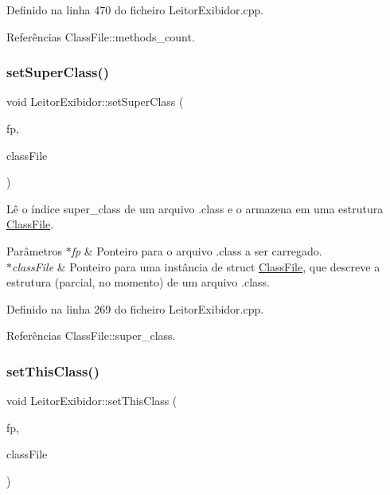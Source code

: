 Definido na linha 470 do ficheiro Leitor\+Exibidor.\+cpp.



Referências Class\+File\+::methods\+\_\+count.

\mbox{\label{classLeitorExibidor_af726ef535e88d9d86938a2d6aad6658c}} 
\subsubsection{\texorpdfstring{set\+Super\+Class()}{setSuperClass()}}
{\footnotesize\ttfamily void Leitor\+Exibidor\+::set\+Super\+Class (\begin{DoxyParamCaption}\item[{F\+I\+LE $\ast$}]{fp,  }\item[{\hyperlink{classClassFile}{Class\+File} $\ast$}]{class\+File }\end{DoxyParamCaption})\hspace{0.3cm}{\ttfamily [private]}}

Lê o índice super\+\_\+class de um arquivo .class e o armazena em uma estrutura \hyperlink{classClassFile}{Class\+File}. 
\begin{DoxyParams}{Parâmetros}
{\em $\ast$fp} & Ponteiro para o arquivo .class a ser carregado. \\
\hline
{\em $\ast$class\+File} & Ponteiro para uma instância de struct \hyperlink{classClassFile}{Class\+File}, que descreve a estrutura (parcial, no momento) de um arquivo .class. \\
\hline
\end{DoxyParams}


Definido na linha 269 do ficheiro Leitor\+Exibidor.\+cpp.



Referências Class\+File\+::super\+\_\+class.

\mbox{\label{classLeitorExibidor_af0f402911ed326bd9e495eef93a43c24}} 
\subsubsection{\texorpdfstring{set\+This\+Class()}{setThisClass()}}
{\footnotesize\ttfamily void Leitor\+Exibidor\+::set\+This\+Class (\begin{DoxyParamCaption}\item[{F\+I\+LE $\ast$}]{fp,  }\item[{\hyperlink{classClassFile}{Class\+File} $\ast$}]{class\+File }\end{DoxyParamCaption})\hspace{0.3cm}{\ttfamily [private]}}

